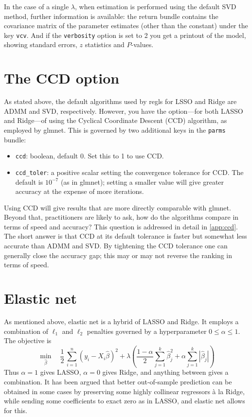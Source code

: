 \documentclass{article}
\begin{document}
In the case of a single $\lambda$, when estimation is performed using
the default SVD method, further information is available: the return
bundle contains the covariance matrix of the parameter estimates
(other than the constant) under the key \texttt{vcv}. And if the
\texttt{verbosity} option is set to 2 you get a printout of the model,
showing standard errors, $z$ statistics and $P$-values.

\section{The CCD option}
\label{sec:ccd}

As stated above, the default algorithms used by \textsf{regls} for
LSSO and Ridge are ADMM and SVD, respectively. However, you have the
option---for both LASSO and Ridge---of using the Cyclical Coordinate
Descent (CCD) algorithm, as employed by \textsf{glmnet}. This is
governed by two additional keys in the \texttt{parms} bundle:
\begin{itemize}
\item \texttt{ccd}: boolean, default 0. Set this to 1 to use CCD.
\item \texttt{ccd\_toler}: a positive scalar setting the convergence
  tolerance for CCD. The default is $10^{-7}$ (as in \textsf{glmnet});
  setting a smaller value will give greater accuracy at the expense of
  more iterations.
\end{itemize}

Using CCD will give results that are more directly comparable with
\textsf{glmnet}. Beyond that, practitioners are likely to ask, how do
the algorithms compare in terms of speed and accuracy? This question
is addressed in detail in \ref{app:ccd}. The short answer
is that CCD at its default tolerance is faster but somewhat less
accurate than ADMM and SVD. By tightening the CCD tolerance one can
generally close the accuracy gap; this may or may not reverse the
ranking in terms of speed.

\section{Elastic net}
\label{sec:elnet}

As mentioned above, elastic net is a hybrid of LASSO and Ridge. It
employs a combination of $\ell_1$ and $\ell_2$ penalties governed by a
hyperparameter $0 \leq \alpha \leq 1$. The objective is
\[
    \min_{\hat{\beta}} \quad \frac{1}{2}\,
    \sum_{i=1}^n (y_i - X_i\hat{\beta})^2 +
    \lambda \left(\frac{1-\alpha}{2} \sum_{j=1}^k \hat{\beta}_j^2
      + \alpha \sum_{j=1}^k |\hat{\beta}_j|\right)
  \]
Thus $\alpha = 1$ gives LASSO, $\alpha = 0$ gives Ridge, and anything
between gives a combination. It has been argued that better
out-of-sample prediction can be obtained in some cases by preserving
some highly collinear regressors \`a la Ridge, while sending some
coefficients to exact zero as in LASSO, and elastic net allows for
this.
\end{document}
